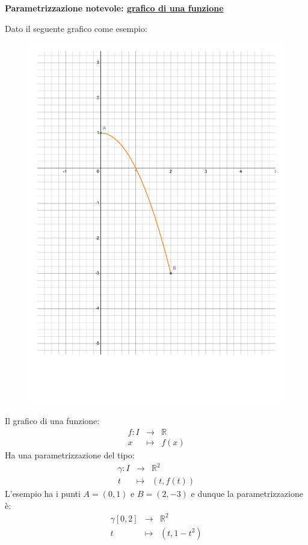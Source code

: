 \documentclass[a4paper]{article}
\newcommand{\definition}[1]{\textcolor{Red3}{\textbf{#1}}}
\begin{document}
	\begin{flushleft}
		\definition{Parametrizzazione notevole: \underline{grafico di una funzione}}
	\end{flushleft}
	Dato il seguente grafico come esempio:
	\begin{figure}[!htp]
		\centering
		\includegraphics[width=.55\textwidth]{img/parametrizzazioni_notevoli-2.pdf}
	\end{figure}

	\noindent
	Il grafico di una funzione:
	\begin{equation*}
		\begin{array}{rcl}
			f : I &\rightarrow& \mathbb{R} \\
			x &\mapsto& f\left(x\right)
		\end{array}
	\end{equation*}
	Ha una parametrizzazione del tipo:
	\begin{equation}
		\begin{array}{rcl}
			\gamma : I &\rightarrow& \mathbb{R}^{2} \\
			t &\mapsto& \left(t, f\left(t\right)\right)
		\end{array}
	\end{equation}
	L'esempio ha i punti $A = \left(0,1\right)$ e $B = \left(2,-3\right)$ e dunque la parametrizzazione è:
	\begin{equation*}
		\begin{array}{rcl}
			\gamma\left[0,2\right] &\rightarrow& \mathbb{R}^{2} \\
			t &\mapsto& \left(t, 1-t^{2}\right)
		\end{array}
	\end{equation*}
\end{document}
